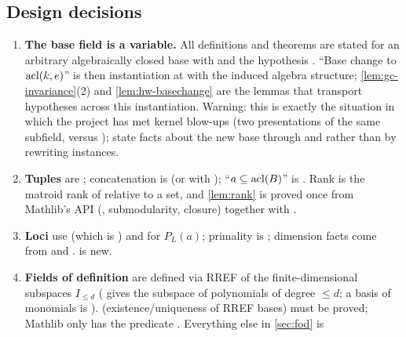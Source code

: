 \subsection{Design decisions}

\begin{enumerate}
\item \textbf{The base field is a variable.}  All definitions and theorems are stated for
  an arbitrary algebraically closed base  with
  \lean{[Field k] [IsAlgClosed k] [Algebra k K] [IsAlgClosed K]} and the hypothesis
  .  ``Base change to $\operatorname{acl}(k,e)$'' is then
  instantiation at  with the induced
  algebra structure; \cref{lem:gc-invariance}(2) and \cref{lem:hw-basechange} are the
  lemmas that transport hypotheses across this instantiation.  Warning: this is exactly
  the situation in which the project has met kernel blow-ups (two presentations of the
  same subfield,  versus ); state facts about the new
  base through  and
   rather than by rewriting instances.
\item \textbf{Tuples} are ; concatenation is  (or
   with ); ``$a\subseteq\operatorname{acl}(B)$'' is
  .  Rank is the matroid rank of
   relative to a set, and \cref{lem:rank} is
  proved once from Mathlib's  API (, submodularity,
  closure) together with .
\item \textbf{Loci} use  (which is
  ) and 
  for $P_L(a)$; primality is ; dimension facts
  come from  and .
   is new.
\item \textbf{Fields of definition} are defined via RREF of the finite-dimensional
  subspaces $I_{\le d}$ ( gives the subspace of
  polynomials of degree $\le d$; a basis of monomials is ).
   (existence/uniqueness of RREF bases) must be proved; Mathlib only has
  the predicate .  Everything else in \cref{sec:fod} is

\end{enumerate}
